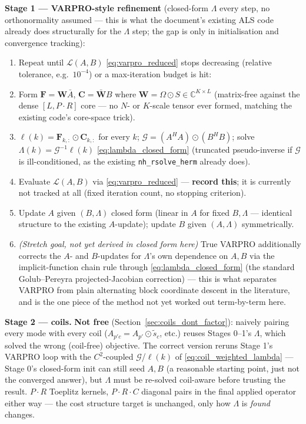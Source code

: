 \documentclass{article}
\begin{document}
\textbf{Stage 1 — VARPRO-style refinement} (closed-form $\Lambda$ every step, no orthonormality
assumed — this is what the document's existing ALS code already does structurally for the
$\Lambda$ step; the gap is only in initialisation and convergence tracking):
\begin{enumerate}[label=\arabic*.]
    \item[] Repeat until $\mathcal{L}(A,B)$ \eqref{eq:varpro_reduced} stops decreasing
            (relative tolerance, e.g.\ $10^{-4}$) or a max-iteration budget is hit:
    \item Form $\mathbf{F}=\mathbf{W}\bar A$, $\mathbf{C}=\bar{\mathbf{W}}B$ where
          $\mathbf{W}=\Omega\odot S\in\mathbb{C}^{K\times L}$ (matrix-free against the dense
          $[L,P\cdot R]$ core — no $N$- or $K$-scale tensor ever formed, matching the existing
          code's core-space trick).
    \item $\boldsymbol\ell(k) = \mathbf{F}_{k,:}\odot\mathbf{C}_{k,:}$ for every $k$;
          $\mathcal{G}=(A^HA)\odot(B^HB)$; solve
          $\Lambda(k)=\mathcal{G}^{-1}\boldsymbol\ell(k)$ \eqref{eq:lambda_closed_form} (truncated
          pseudo-inverse if $\mathcal{G}$ is ill-conditioned, as the existing
          \texttt{nh\_rsolve\_herm} already does).
    \item Evaluate $\mathcal{L}(A,B)$ via \eqref{eq:varpro_reduced} — \textbf{record this}; it is
          currently not tracked at all (fixed iteration count, no stopping criterion).
    \item Update $A$ given $(B,\Lambda)$ closed form (linear in $A$ for fixed $B,\Lambda$ —
          identical structure to the existing $A$-update); update $B$ given $(A,\Lambda)$
          symmetrically.
    \item \emph{(Stretch goal, not yet derived in closed form here)} True VARPRO additionally
          corrects the $A$- and $B$-updates for $\Lambda$'s own dependence on $A,B$ via the
          implicit-function chain rule through \eqref{eq:lambda_closed_form} (the standard
          Golub--Pereyra projected-Jacobian correction) — this is what separates VARPRO from plain
          alternating block coordinate descent in the literature, and is the one piece of the
          method not yet worked out term-by-term here.
\end{enumerate}

\textbf{Stage 2 — coils.} \textbf{Not free} (Section~\ref{sec:coils_dont_factor}): naively
pairing every mode with every coil ($A_{p'c}=A_{p'}\odot\tilde s_c$, etc.) reuses Stages 0--1's
$\Lambda$, which solved the wrong (coil-free) objective. The correct version reruns Stage 1's
VARPRO loop with the $C^2$-coupled $\mathcal{G}$/$\boldsymbol\ell(k)$ of
\eqref{eq:coil_weighted_lambda} — Stage 0's closed-form init can still seed $A,B$ (a reasonable
starting point, just not the converged answer), but $\Lambda$ must be re-solved coil-aware before
trusting the result. $P\cdot R$ Toeplitz kernels, $P\cdot R\cdot C$ diagonal pairs in the final
applied operator either way — the cost structure target is unchanged, only how $\Lambda$ is
\emph{found} changes.
\end{document}
